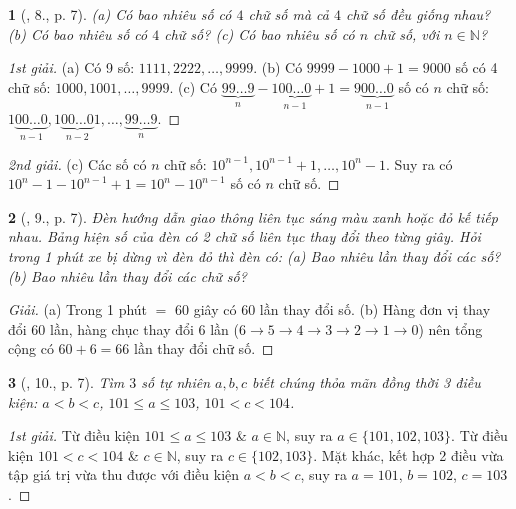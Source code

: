 \documentclass{article}
\newtheorem{baitoan}{}
\begin{document}
\begin{baitoan}[\cite{Tuyen_Toan_6}, 8., p. 7]
	(a) Có bao nhiêu số có $4$ chữ số mà cả $4$ chữ số đều giống nhau? (b) Có bao nhiêu số có $4$ chữ số? (c) Có bao nhiêu số có $n$ chữ số, với $n\in\mathbb{N}$?
\end{baitoan}

\begin{proof}[1st giải]
	(a) Có 9 số: $1111,2222,\ldots,9999$. (b) Có $9999 - 1000 + 1 = 9000$ số có 4 chữ số: $1000,1001,\ldots,9999$. (c) Có $\underbrace{99\ldots9}_n - 1\underbrace{00\ldots0}_{n-1} + 1 = 9\underbrace{00\ldots0}_{n-1}$ số có $n$ chữ số: $1\underbrace{00\ldots0}_{n-1},1\underbrace{00\ldots0}_{n-2}1,\ldots,\underbrace{99\ldots9}_n$.
\end{proof}

\begin{proof}[2nd giải]
	(c) Các số có $n$ chữ số: $10^{n-1},10^{n-1} + 1,\ldots,10^n - 1$. Suy ra có $10^n - 1 - 10^{n-1} + 1 = 10^n - 10^{n-1}$ số có $n$ chữ số.
\end{proof}

\begin{baitoan}[\cite{Tuyen_Toan_6}, 9., p. 7]
	Đèn hướng dẫn giao thông liên tục sáng màu xanh hoặc đỏ kế tiếp nhau. Bảng hiện số của đèn có 2 chữ số liên tục thay đổi theo từng giây. Hỏi trong 1 phút xe bị dừng vì đèn đỏ thì đèn có: (a) Bao nhiêu lần thay đổi các số? (b) Bao nhiêu lần thay đổi các chữ số?
\end{baitoan}

\begin{proof}[Giải]
	(a) Trong 1 phút $=$ 60 giây có 60 lần thay đổi số. (b) Hàng đơn vị thay đổi 60 lần, hàng chục thay đổi 6 lần ($6\to5\to4\to3\to2\to1\to0$) nên tổng cộng có $60 + 6 = 66$ lần thay đổi chữ số.
\end{proof}

\begin{baitoan}[\cite{Tuyen_Toan_6}, 10., p. 7]
	Tìm $3$ số tự nhiên $a,b,c$ biết chúng thỏa mãn đồng thời 3 điều kiện: $a < b < c$, $101\le a\le103$, $101 < c < 104$.
\end{baitoan}

\begin{proof}[1st giải]
	Từ điều kiện $101\le a\le103$ \& $a\in\mathbb{N}$, suy ra $a\in\{101,102,103\}$. Từ điều kiện $101 < c < 104$ \& $c\in\mathbb{N}$, suy ra $c\in\{102,103\}$. Mặt khác, kết hợp 2 điều vừa tập giá trị vừa thu được với điều kiện $a < b < c$, suy ra $a = 101$, $b = 102$, $c = 103$.
\end{proof}
\end{document}
